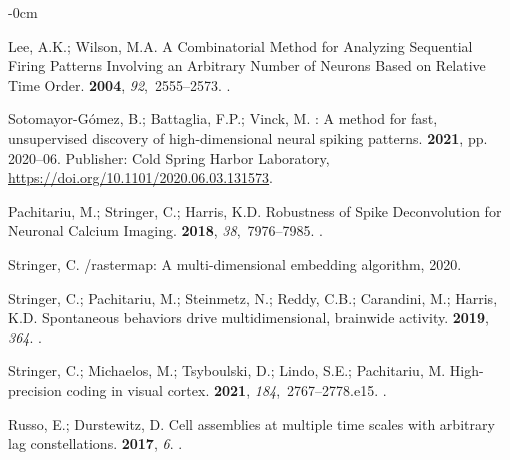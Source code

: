 \documentclass[brainsci, %
               review,submit,pdftex,moreauthors
               ]{Definitions/mdpi}
\begin{document}
\begin{adjustwidth}{-\extralength}{0cm}
\begin{thebibliography}{999}
  Lee, A.K.; Wilson, M.A.
  \newblock A {Combinatorial} {Method} for {Analyzing} {Sequential} {Firing}
    {Patterns} {Involving} an {Arbitrary} {Number} of {Neurons} {Based} on
    {Relative} {Time} {Order}.
   {\bf 2004}, {\em 92},~2555--2573.
  .
  
  Sotomayor-Gómez, B.; Battaglia, F.P.; Vinck, M.
  : {A} method for fast, unsupervised discovery of
    high-dimensional neural spiking patterns.
   {\bf 2021}, pp.
    2020--06.
  \newblock Publisher: Cold Spring Harbor Laboratory,
    {\url{https://doi.org/10.1101/2020.06.03.131573}}.
  
  Pachitariu, M.; Stringer, C.; Harris, K.D.
  \newblock Robustness of {Spike} {Deconvolution} for {Neuronal} {Calcium}
    {Imaging}.
   {\bf 2018}, {\em 38},~7976--7985.
  .
  
  Stringer, C.
  /rastermap: {A} multi-dimensional embedding algorithm,
    2020.
  
  Stringer, C.; Pachitariu, M.; Steinmetz, N.; Reddy, C.B.; Carandini, M.;
    Harris, K.D.
  \newblock Spontaneous behaviors drive multidimensional, brainwide activity.
   {\bf 2019}, {\em 364}.
  .
  
  Stringer, C.; Michaelos, M.; Tsyboulski, D.; Lindo, S.E.; Pachitariu, M.
  \newblock High-precision coding in visual cortex.
   {\bf 2021}, {\em 184},~2767--2778.e15.
  .
  
  Russo, E.; Durstewitz, D.
  \newblock Cell assemblies at multiple time scales with arbitrary lag
    constellations.
   {\bf 2017}, {\em 6}.
  .
  

\end{thebibliography}
\end{adjustwidth}
\end{document}
